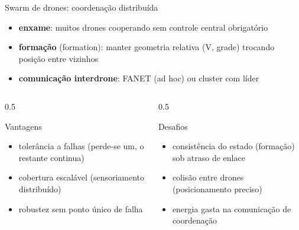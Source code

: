 \documentclass[aspectratio=169,11pt]{beamer}
\begin{document}
\begin{frame}{Swarm de drones: coordenação distribuída}
  \begin{itemize}
    \item \textbf{enxame}: muitos drones cooperando sem controle central obrigatório
    \item \textbf{formação} (formation): manter geometria relativa (V, grade) trocando posição entre vizinhos
    \item \textbf{comunicação interdrone}: FANET (ad hoc) ou cluster com líder
  \end{itemize}
  \begin{columns}
    \begin{column}{0.5\textwidth}
      \begin{block}{Vantagens}
        \begin{itemize}
          \item tolerância a falhas (perde-se um, o restante continua)
          \item cobertura escalável (sensoriamento distribuído)
          \item robustez sem ponto único de falha
        \end{itemize}
      \end{block}
    \end{column}
    \begin{column}{0.5\textwidth}
      \begin{alertblock}{Desafios}
        \begin{itemize}
          \item consistência do estado (formação) sob atraso de enlace
          \item colisão entre drones (posicionamento preciso)
          \item energia gasta na comunicação de coordenação
        \end{itemize}
      \end{alertblock}
    \end{column}
  \end{columns}
\end{frame}
\end{document}
